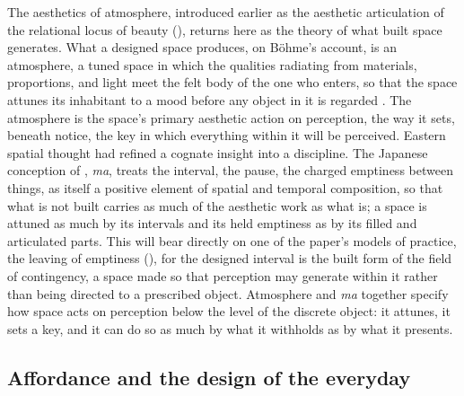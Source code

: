 The aesthetics of atmosphere, introduced earlier as the aesthetic articulation of the relational locus of beauty (), returns here as the theory of what built space generates. What a designed space produces, on B\"{o}hme's account, is an atmosphere, a tuned space in which the qualities radiating from materials, proportions, and light meet the felt body of the one who enters, so that the space attunes its inhabitant to a mood before any object in it is regarded \parencite{bohme2017}. The atmosphere is the space's primary aesthetic action on perception, the way it sets, beneath notice, the key in which everything within it will be perceived. Eastern spatial thought had refined a cognate insight into a discipline. The Japanese conception of , \emph{ma}, treats the interval, the pause, the charged emptiness between things, as itself a positive element of spatial and temporal composition, so that what is not built carries as much of the aesthetic work as what is; a space is attuned as much by its intervals and its held emptiness as by its filled and articulated parts. This will bear directly on one of the paper's models of practice, the leaving of emptiness (), for the designed interval is the built form of the field of contingency, a space made so that perception may generate within it rather than being directed to a prescribed object. Atmosphere and \emph{ma} together specify how space acts on perception below the level of the discrete object: it attunes, it sets a key, and it can do so as much by what it withholds as by what it presents.

\subsection{Affordance and the design of the everyday}
\label{p23:sub:space-design}

